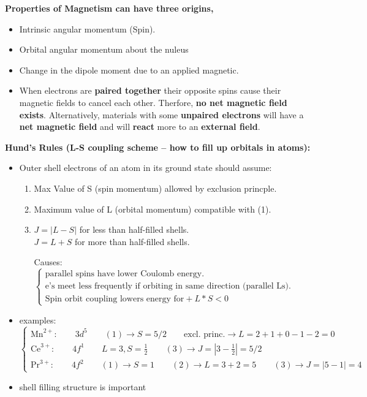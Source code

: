 \textbf{Properties of Magnetism can have three origins,}
\begin{itemize}
    \item Intrinsic angular momentum (Spin). 
    \item Orbital angular momentum about the nuleus
    \item Change in the dipole moment due to an applied magnetic.
    
    \item When electrons are \textbf{paired together} their opposite spins cause their magnetic fields to cancel each other. Therfore, \textbf{no net magnetic field exists}. Alternatively, materials with some \textbf{unpaired electrons} will have a \textbf{net magnetic field} and will \textbf{react} more to an \textbf{external field}.
\end{itemize}

\textbf{Hund's Rules (L-S coupling scheme -- how to fill up orbitals in atoms):}
\begin{itemize}
    \item Outer shell electrons of an atom in its ground state should assume:
    \begin{enumerate}
        \item Max Value of S (spin momentum) allowed by exclusion princple.
        \item Maximum value of L (orbital momentum) compatible with (1).
        \item $J=|L-S|$ for less than half-filled shells. \\$J = L+S$ for more than half-filled shells.
        
        Causes: 
        $
        \begin{cases}
        \text{parallel spins have lower Coulomb energy.}\\
        \text{e's meet less frequently if orbiting in same direction (parallel Ls).} \\
        \text{Spin orbit coupling lowers energy for} + L*S < 0
        \end{cases}
        $
    \end{enumerate}
    
    \item examples:\\
    $
    \begin{cases}
    \text{Mn}^{2+}: \qquad 3d^5 \qquad (1) \rightarrow S=5/2 \qquad \text{excl. princ.} \rightarrow L = 2+1+0-1-2 = 0 \\
    \text{Ce}^{3+}:\qquad 4f^1 \qquad L = 3, S = \frac{1}{2} \qquad (3) \rightarrow J = |3-\frac{1}{2}| = 5/2 \\
    \text{Pr}^{3+}: \qquad 4f^2
    \qquad (1) \rightarrow S = 1 \qquad (2) \rightarrow L = 3+2 = 5 \qquad (3) \rightarrow J = |5-1|=4
    \end{cases}
    $
    \item shell filling structure is important
\end{itemize}

